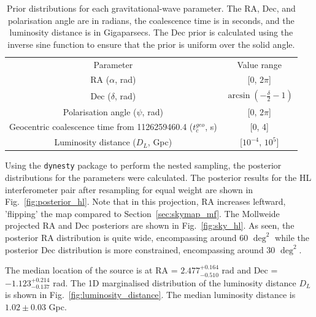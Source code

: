 \documentclass[11pt,a4paper]{article}
\begin{document}
\begin{table}[h]
    \centering
    \begin{tabular}{cc}
    Parameter & Value range \\
    RA ($\alpha$, rad) & [0, $2\pi$] \\
    Dec ($\delta$, rad) & $\arcsin(-\frac{\delta}{2}-1)$ \\
    Polarisation angle ($\psi$, rad) & [0, $2\pi$] \\
    Geocentric coalescence time from 1126259460.4 ($t_c^{geo}$, s) & [0, 4] \\
    Luminosity distance ($D_L$, Gpc) & [$10^{-4}$, $10^5$] \\
    \end{tabular}
    \caption{Prior distributions for each gravitational-wave parameter. The RA, Dec, and polarisation angle are in radians, the coalescence time is in seconds, and the luminosity distance is in Gigaparsecs. The Dec prior is calculated using the inverse sine function to ensure that the prior is uniform over the solid angle.}
    \label{tab:priors}
\end{table}

Using the \texttt{dynesty} package to perform the nested sampling, the posterior distributions for the parameters were calculated. The posterior results for the HL interferometer pair after resampling for equal weight are shown in Fig.~\ref{fig:posterior_hl}. Note that in this projection, RA increases leftward, 'flipping' the map compared to Section~\ref{sec:skymap_mf}. The Mollweide projected RA and Dec posteriors are shown in Fig.~\ref{fig:sky_hl}. As seen, the posterior RA distribution is quite wide, encompassing around 60 ${\deg}^2$ while the posterior Dec distribution is more constrained, encompassing around 30 ${\deg}^2$. 

The median location of the source is at RA = $2.477^{+0.164}_{-0.510}$ rad and Dec = $-1.123^{+0.214}_{-0.137}$ rad. The 1D marginalised distribution of the luminosity distance $D_L$ is shown in Fig.~\ref{fig:luminosity_distance}. The median luminosity distance is $1.02 \pm 0.03$ Gpc.
\end{document}
